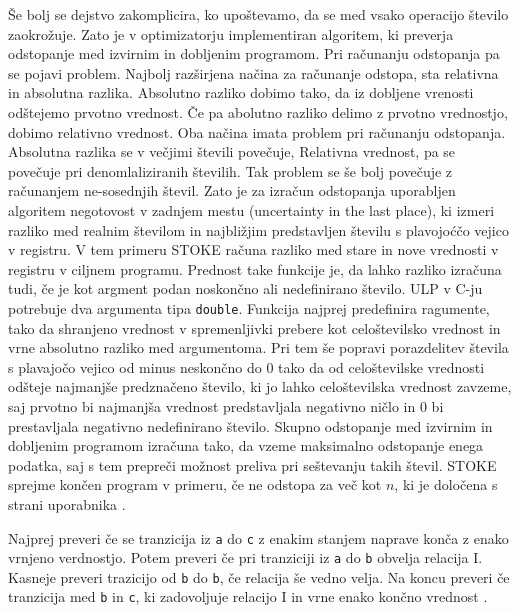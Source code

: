 \documentclass[a4paper, 12pt]{book}
\begin{document}
Še bolj se dejstvo zakomplicira, ko upoštevamo, da se med vsako operacijo število zaokrožuje. Zato je v optimizatorju implementiran algoritem, ki preverja odstopanje med izvirnim in dobljenim programom. Pri računanju odstopanja pa se pojavi problem. Najbolj razširjena načina za računanje odstopa, sta relativna in absolutna razlika. Absolutno razliko dobimo tako, da iz dobljene vrenosti odštejemo prvotno vrednost. Če pa abolutno razliko delimo z prvotno vrednostjo, dobimo relativno vrednost. Oba načina imata problem pri računanju odstopanja. Absolutna razlika se v večjimi števili povečuje, Relativna vrednost, pa se povečuje pri denomlaliziranih številih. Tak problem se še bolj povečuje z računanjem ne-sosednjih števil. Zato je za izračun odstopanja uporabljen algoritem negotovost v zadnjem mestu (uncertainty in the last place), ki izmeri razliko med realnim številom in najbližjim predstavljen številu s plavojoćčo vejico v registru. V tem primeru STOKE računa razliko med stare in nove vrednosti v registru v ciljnem programu. Prednost take funkcije je, da lahko razliko izračuna tudi, če je kot argment podan noskončno ali nedefinirano število. ULP v C-ju potrebuje dva argumenta tipa \texttt{double}. Funkcija najprej predefinira ragumente, tako da shranjeno vrednost v spremenljivki prebere kot celoštevilsko vrednost in vrne absolutno razliko med argumentoma. Pri tem še popravi porazdelitev števila s plavajočo vejico od minus neskončno do 0 tako da od celoštevilske vrednosti odšteje najmanjše predznačeno število, ki jo lahko celoštevilska vrednost zavzeme, saj prvotno bi najmanjša vrednost predstavljala negativno ničlo in 0 bi prestavljala negativno nedefinirano število. Skupno odstopanje med izvirnim in dobljenim programom izračuna tako, da vzeme maksimalno odstopanje enega podatka, saj s tem prepreči možnost preliva pri seštevanju takih števil. STOKE sprejme končen program v primeru, če ne odstopa za več kot \(n\), ki je določena s strani uporabnika \cite{float2}.

Najprej preveri če se tranzicija iz \texttt{a} do \texttt{c} z enakim stanjem naprave konča z enako vrnjeno verdnostjo. Potem preveri če pri tranziciji iz \texttt{a} do \texttt{b} obvelja relacija I. Kasneje preveri trazicijo od \texttt{b} do \texttt{b}, če relacija še vedno velja. Na koncu preveri če tranzicija med \texttt{b} in \texttt{c}, ki zadovoljuje relacijo I in vrne enako končno vrednost \cite{sto}.



\ \\
\newpage

\clearpage  
{}


\end{document}
